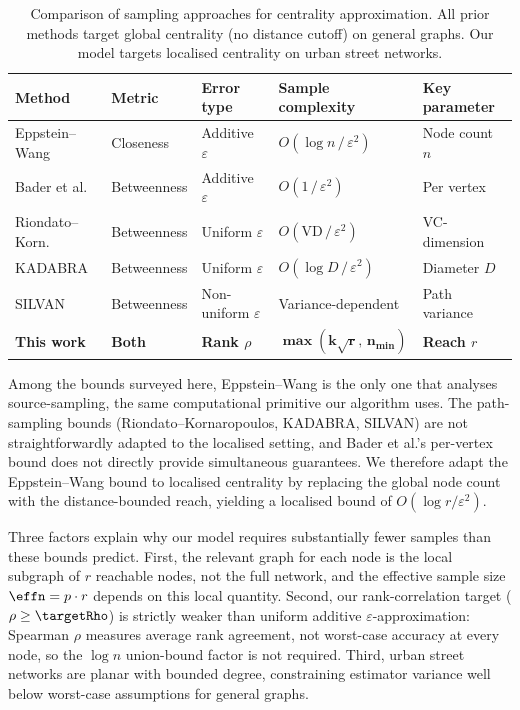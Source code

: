 \begin{table}[htbp]
\centering
\caption{Comparison of sampling approaches for centrality approximation. All prior methods target global centrality (no distance cutoff) on general graphs. Our model targets localised centrality on urban street networks.}
\label{tab:bounds_comparison}
\small
\begin{tabular}{@{}lllll@{}}
\toprule
\textbf{Method} & \textbf{Metric} & \textbf{Error type} & \textbf{Sample complexity} & \textbf{Key parameter} \\
\midrule
Eppstein--Wang & Closeness & Additive $\varepsilon$ & $O(\log n \,/\, \varepsilon^2)$ & Node count $n$ \\
Bader et al.\ & Betweenness & Additive $\varepsilon$ & $O(1 \,/\, \varepsilon^2)$ & Per vertex \\
Riondato--Korn.\ & Betweenness & Uniform $\varepsilon$ & $O(\text{VD} \,/\, \varepsilon^2)$ & VC-dimension \\
KADABRA & Betweenness & Uniform $\varepsilon$ & $O(\log D \,/\, \varepsilon^2)$ & Diameter $D$ \\
SILVAN & Betweenness & Non-uniform $\varepsilon$ & Variance-dependent & Path variance \\
\textbf{This work} & \textbf{Both} & \textbf{Rank $\rho$} & $\boldsymbol{\max(k\sqrt{r},\, n_{\min})}$ & \textbf{Reach $r$} \\
\bottomrule
\end{tabular}
\end{table}

Among the bounds surveyed here, Eppstein--Wang is the only one that analyses source-sampling, the same computational primitive our algorithm uses. The path-sampling bounds (Riondato--Kornaropoulos, KADABRA, SILVAN) are not straightforwardly adapted to the localised setting, and Bader et al.'s per-vertex bound does not directly provide simultaneous guarantees. We therefore adapt the Eppstein--Wang bound to localised centrality by replacing the global node count with the distance-bounded reach, yielding a localised bound of $O(\log r / \varepsilon^2)$.

Three factors explain why our model requires substantially fewer samples than these bounds predict. First, the relevant graph for each node is the local subgraph of $r$ reachable nodes, not the full network, and the effective sample size $\effn = p \cdot r$ depends on this local quantity. Second, our rank-correlation target ($\rho \geq \targetRho$) is strictly weaker than uniform additive $\varepsilon$-approximation: Spearman $\rho$ measures average rank agreement, not worst-case accuracy at every node, so the $\log n$ union-bound factor is not required. Third, urban street networks are planar with bounded degree, constraining estimator variance well below worst-case assumptions for general graphs.

